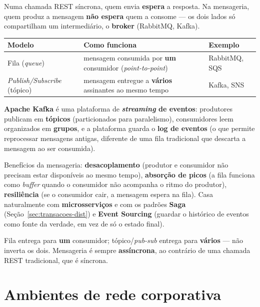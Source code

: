 \begin{conceito}
Numa chamada REST síncrona, quem envia \textbf{espera} a resposta. Na
mensageria, quem produz a mensagem \textbf{não espera} quem a consome ---
os dois lados só compartilham um intermediário, o \textbf{broker}
(RabbitMQ, Kafka).

\begin{center}
\begin{tabular}{@{}p{3.2cm}p{4.6cm}p{3cm}@{}}
\toprule
\textbf{Modelo} & \textbf{Como funciona} & \textbf{Exemplo} \\
\midrule
Fila (\textit{queue}) & mensagem consumida por \textbf{um} consumidor
(\textit{point-to-point}) & RabbitMQ, SQS \\
\textit{Publish/Subscribe} (tópico) & mensagem entregue a \textbf{vários}
assinantes ao mesmo tempo & Kafka, SNS \\
\bottomrule
\end{tabular}
\end{center}

\textbf{Apache Kafka} é uma plataforma de \textbf{\textit{streaming} de
eventos}: produtores publicam em \textbf{tópicos} (particionados para
paralelismo), consumidores leem organizados em \textbf{grupos}, e a
plataforma guarda o \textbf{log de eventos} (o que permite reprocessar
mensagens antigas, diferente de uma fila tradicional que descarta a
mensagem ao ser consumida).

Benefícios da mensageria: \textbf{desacoplamento} (produtor e consumidor
não precisam estar disponíveis ao mesmo tempo), \textbf{absorção de picos}
(a fila funciona como \textit{buffer} quando o consumidor não acompanha o
ritmo do produtor), \textbf{resiliência} (se o consumidor cair, a mensagem
espera na fila). Casa naturalmente com \textbf{microsserviços} e com os
padrões \textbf{Saga} (Seção~\ref{sec:transacoes-dist}) e
\textbf{Event Sourcing} (guardar o histórico de eventos como fonte da
verdade, em vez de só o estado final).
\end{conceito}

\begin{cuidado}
Fila entrega para \textbf{um} consumidor; tópico/\textit{pub-sub} entrega
para \textbf{vários} --- não inverta os dois. Mensageria é sempre
\textbf{assíncrona}, ao contrário de uma chamada REST tradicional, que é
síncrona.
\end{cuidado}

\section{Ambientes de rede corporativa}

